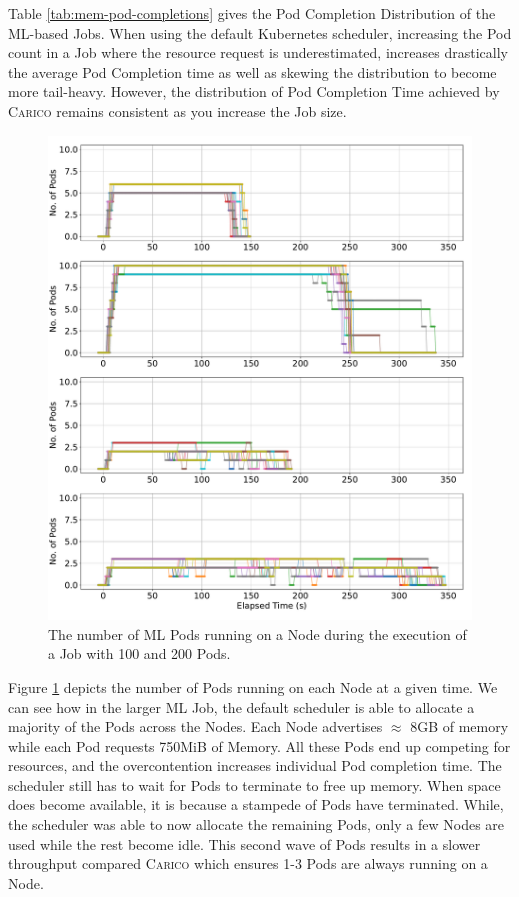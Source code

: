 Table \ref{tab:mem-pod-completions} gives the Pod Completion Distribution of the
ML-based Jobs. When using the default Kubernetes scheduler, increasing the Pod
count in a Job where the resource request is underestimated, increases
drastically the average Pod Completion time as well as skewing the distribution
to become more tail-heavy. However, the distribution of Pod Completion Time
achieved by \textsc{Carico} remains consistent as you increase the Job size.

\begin{figure}[ht!]
    \centering
    \includegraphics[width=\textwidth]{images/ml-running-pods.pdf}
    \caption{The number of ML Pods running on a Node during the
    execution of a Job with 100 and 200 Pods.}
    \label{fig:ml-pod-running}
\end{figure}
Figure \ref{fig:ml-pod-running} depicts the number of Pods running on each Node
at a given time. We can see how in the larger ML Job, the default scheduler is
able to allocate a majority of the Pods across the Nodes. Each Node advertises
$\approx$ 8GB of memory while each Pod requests 750MiB of Memory. All these Pods
end up competing for resources, and the overcontention increases individual
Pod completion time. The scheduler still has to wait for Pods to terminate to
free up memory. When space does become available, it is because a
stampede of Pods have terminated. While, the scheduler was able to now allocate
the remaining Pods, only a few Nodes are used while the rest become idle. This
second wave of Pods results in a slower throughput compared \textsc{Carico} which ensures
1-3 Pods are always running on a Node.

